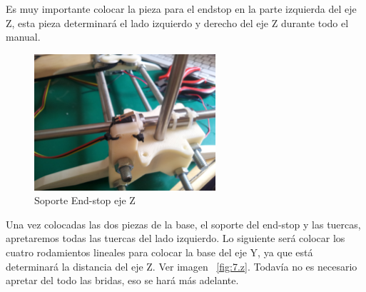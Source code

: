 		Es muy importante colocar la pieza para el endstop en la parte izquierda del eje Z, esta pieza determinará el lado izquierdo y derecho del eje Z durante todo el manual.
		\begin{figure}[!htp]
			\centering
			\includegraphics[width=0.6\textwidth]{../../Fotos/78.jpg}
			\caption{Soporte End-stop eje Z}
			\label{fig:4.z}
		\end{figure}
		Una vez colocadas las dos piezas de la base, el soporte del end-stop y las tuercas, apretaremos todas las tuercas del lado izquierdo. Lo siguiente será colocar los cuatro rodamientos lineales para colocar la base del eje Y, ya que está determinará la distancia del eje Z. Ver imagen ~\ref{fig:7.z}. Todavía no es necesario apretar del todo las bridas, eso se hará más adelante.
